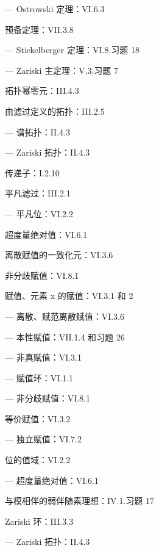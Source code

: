 --- Ostrowski 定理：VI.6.3

预备定理：VII.3.8

--- Stickelberger 定理：VI.8.习题 18

--- Zariski 主定理：V.3.习题 7

拓扑幂零元：III.4.3

由滤过定义的拓扑：III.2.5

--- 谱拓扑：II.4.3

--- Zariski 拓扑：II.4.3

传递子：I.2.10

平凡滤过：III.2.1

--- 平凡位：VI.2.2

超度量绝对值：VI.6.1

离散赋值的一致化元：VI.3.6

非分歧赋值：VI.8.1

赋值、元素 x 的赋值：VI.3.1 和 2

--- 离散、赋范离散赋值：VI.3.6

--- 本性赋值：VII.1.4 和习题 26

--- 非真赋值：VI.3.1

--- 赋值环：VI.1.1

--- 非分歧赋值：VI.8.1

等价赋值：VI.3.2

--- 独立赋值：VI.7.2

位的值域：VI.2.2

--- 超度量绝对值：VI.6.1

与模相伴的弱伴随素理想：IV.1.习题 17

Zariski 环：III.3.3

--- Zariski 拓扑：II.4.3

